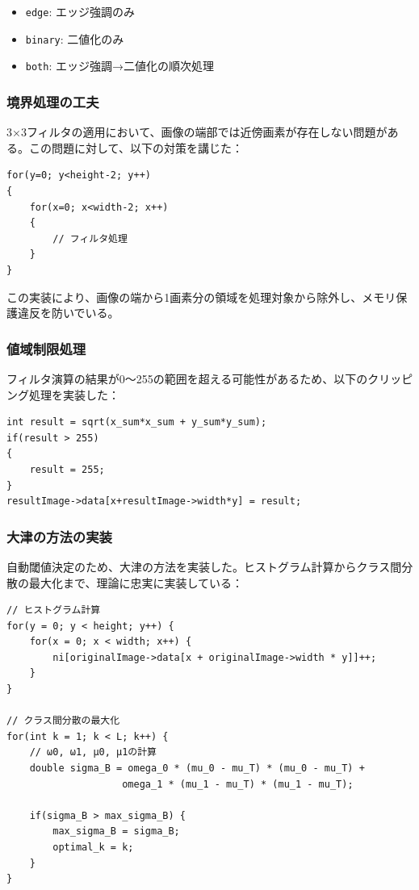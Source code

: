 \documentclass[a4paper,12pt]{jsarticle}
\begin{document}
\begin{itemize}
\item \texttt{edge}: エッジ強調のみ
\item \texttt{binary}: 二値化のみ
\item \texttt{both}: エッジ強調→二値化の順次処理
\end{itemize}

\subsubsection{境界処理の工夫}
3×3フィルタの適用において、画像の端部では近傍画素が存在しない問題がある。この問題に対して、以下の対策を講じた：

\begin{lstlisting}[caption=境界処理の実装]
for(y=0; y<height-2; y++)
{
    for(x=0; x<width-2; x++)
    {
        // フィルタ処理
    }
}
\end{lstlisting}

この実装により、画像の端から1画素分の領域を処理対象から除外し、メモリ保護違反を防いでいる。

\subsubsection{値域制限処理}
フィルタ演算の結果が0〜255の範囲を超える可能性があるため、以下のクリッピング処理を実装した：

\begin{lstlisting}[caption=値域制限処理]
int result = sqrt(x_sum*x_sum + y_sum*y_sum);
if(result > 255)
{
    result = 255;
}
resultImage->data[x+resultImage->width*y] = result;
\end{lstlisting}

\subsubsection{大津の方法の実装}
自動閾値決定のため、大津の方法を実装した。ヒストグラム計算からクラス間分散の最大化まで、理論に忠実に実装している：

\begin{lstlisting}[caption=大津の方法の主要部分]
// ヒストグラム計算
for(y = 0; y < height; y++) {
    for(x = 0; x < width; x++) {
        ni[originalImage->data[x + originalImage->width * y]]++;
    }
}

// クラス間分散の最大化
for(int k = 1; k < L; k++) {
    // ω0, ω1, μ0, μ1の計算
    double sigma_B = omega_0 * (mu_0 - mu_T) * (mu_0 - mu_T) + 
                    omega_1 * (mu_1 - mu_T) * (mu_1 - mu_T);
    
    if(sigma_B > max_sigma_B) {
        max_sigma_B = sigma_B;
        optimal_k = k;
    }
}
\end{lstlisting}
\end{document}
